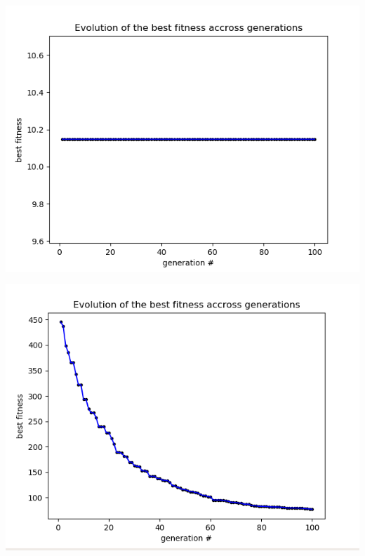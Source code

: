 \documentclass[12pt]{article}
\begin{document}
				\begin{minipage}{0.6\linewidth}
					\includegraphics[width=\linewidth]{7.png}
				\end{minipage}
				\hfill
				\begin{minipage}{0.6\linewidth}
					\includegraphics[width=\linewidth]{8.png}
				\end{minipage}
\end{document}
